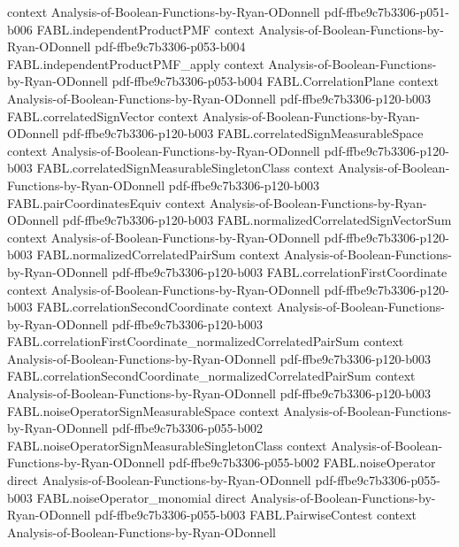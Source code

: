 \begin{theorem}
  {context}
  {Analysis-of-Boolean-Functions-by-Ryan-ODonnell}
  {pdf-ffbe9c7b3306-p051-b006}
\proofstep
  {FABL.independentProductPMF}
  {context}
  {Analysis-of-Boolean-Functions-by-Ryan-ODonnell}
  {pdf-ffbe9c7b3306-p053-b004}
\proofstep
  {FABL.independentProductPMF_apply}
  {context}
  {Analysis-of-Boolean-Functions-by-Ryan-ODonnell}
  {pdf-ffbe9c7b3306-p053-b004}
\proofstep
  {FABL.CorrelationPlane}
  {context}
  {Analysis-of-Boolean-Functions-by-Ryan-ODonnell}
  {pdf-ffbe9c7b3306-p120-b003}
\proofstep
  {FABL.correlatedSignVector}
  {context}
  {Analysis-of-Boolean-Functions-by-Ryan-ODonnell}
  {pdf-ffbe9c7b3306-p120-b003}
\proofstep
  {FABL.correlatedSignMeasurableSpace}
  {context}
  {Analysis-of-Boolean-Functions-by-Ryan-ODonnell}
  {pdf-ffbe9c7b3306-p120-b003}
\proofstep
  {FABL.correlatedSignMeasurableSingletonClass}
  {context}
  {Analysis-of-Boolean-Functions-by-Ryan-ODonnell}
  {pdf-ffbe9c7b3306-p120-b003}
\proofstep
  {FABL.pairCoordinatesEquiv}
  {context}
  {Analysis-of-Boolean-Functions-by-Ryan-ODonnell}
  {pdf-ffbe9c7b3306-p120-b003}
\proofstep
  {FABL.normalizedCorrelatedSignVectorSum}
  {context}
  {Analysis-of-Boolean-Functions-by-Ryan-ODonnell}
  {pdf-ffbe9c7b3306-p120-b003}
\proofstep
  {FABL.normalizedCorrelatedPairSum}
  {context}
  {Analysis-of-Boolean-Functions-by-Ryan-ODonnell}
  {pdf-ffbe9c7b3306-p120-b003}
\proofstep
  {FABL.correlationFirstCoordinate}
  {context}
  {Analysis-of-Boolean-Functions-by-Ryan-ODonnell}
  {pdf-ffbe9c7b3306-p120-b003}
\proofstep
  {FABL.correlationSecondCoordinate}
  {context}
  {Analysis-of-Boolean-Functions-by-Ryan-ODonnell}
  {pdf-ffbe9c7b3306-p120-b003}
\proofstep
  {FABL.correlationFirstCoordinate_normalizedCorrelatedPairSum}
  {context}
  {Analysis-of-Boolean-Functions-by-Ryan-ODonnell}
  {pdf-ffbe9c7b3306-p120-b003}
\proofstep
  {FABL.correlationSecondCoordinate_normalizedCorrelatedPairSum}
  {context}
  {Analysis-of-Boolean-Functions-by-Ryan-ODonnell}
  {pdf-ffbe9c7b3306-p120-b003}
\proofstep
  {FABL.noiseOperatorSignMeasurableSpace}
  {context}
  {Analysis-of-Boolean-Functions-by-Ryan-ODonnell}
  {pdf-ffbe9c7b3306-p055-b002}
\proofstep
  {FABL.noiseOperatorSignMeasurableSingletonClass}
  {context}
  {Analysis-of-Boolean-Functions-by-Ryan-ODonnell}
  {pdf-ffbe9c7b3306-p055-b002}
\proofstep
  {FABL.noiseOperator}
  {direct}
  {Analysis-of-Boolean-Functions-by-Ryan-ODonnell}
  {pdf-ffbe9c7b3306-p055-b003}
\proofstep
  {FABL.noiseOperator_monomial}
  {direct}
  {Analysis-of-Boolean-Functions-by-Ryan-ODonnell}
  {pdf-ffbe9c7b3306-p055-b003}
\proofstep
  {FABL.PairwiseContest}
  {context}
  {Analysis-of-Boolean-Functions-by-Ryan-ODonnell}

\end{theorem}

